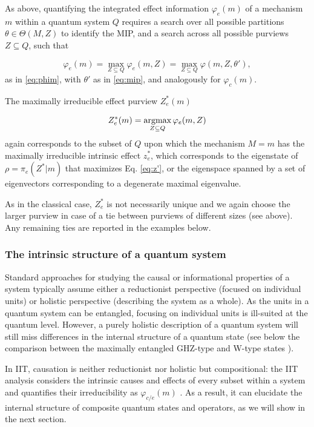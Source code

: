 \documentclass[preprints, article, accept, pdftex, moreauthors, letterpaper]{Definitions/mdpi}
\renewcommand{\=}[1]{\stackrel{#1}{=}} %
\newcommand{\p}{\theta} %
\newcommand{\Part}{\Theta}
\renewcommand{\*}{\otimes}%
\newcommand*{\argmax}{\operatornamewithlimits{argmax}\limits}
\begin{document}
As above, quantifying the integrated effect information $\varphi_e(m)$ of a mechanism $m$ within a quantum system $Q$ requires a search over all possible partitions $\p \in \Part(M,Z)$ to identify the MIP, and a search across all possible purviews $Z \subseteq Q$, such that

\begin{equation}
 \varphi_e(m) = \max_{Z \subseteq Q} \varphi_e(m, Z) = \max_{Z \subseteq Q} \varphi(m, Z, \theta'),   
\end{equation}
as in \eqref{eq:phim}, with $\theta'$ as in \eqref{eq:mip}, and analogously for $\varphi_c(m)$. 

The maximally irreducible effect purview $Z^*_e(m)$ 

\begin{equation}
    Z^*_e(m) = \argmax_{Z \subseteq Q} \varphi_e(m, Z)     
\end{equation}
%
again corresponds to the subset of $Q$ upon which the mechanism $M = m$ has the maximally irreducible intrinsic effect $z^*_e$, which corresponds to the eigenstate of $\rho = \pi_e(Z^*|m)$ that maximizes Eq. \eqref{eq:z'}, or the eigenspace spanned by a set of eigenvectors corresponding to a degenerate maximal eigenvalue.

As in the classical case, $Z^*_e$ is not necessarily unique and we again choose the larger purview in case of a tie between purviews of different sizes (see above). Any remaining ties are reported in the examples below.

\subsubsection{The intrinsic structure of a quantum system}

Standard approaches for studying the causal or informational properties of a system typically assume either a reductionist perspective (focused on individual units) or holistic perspective (describing the system as a whole). 
As the units in a quantum system can be entangled, focusing on individual units is ill-suited at the quantum level. However, a purely holistic description of a quantum system will still miss differences in the internal structure of a quantum state (see below the comparison between the maximally entangled GHZ-type and W-type states \cite{Dur2000}).

In IIT, causation is neither reductionist nor holistic but compositional: the IIT analysis considers the intrinsic causes and effects of every subset within a system and quantifies their irreducibility as $\varphi_{c/e}(m)$ \cite{Albantakis2019cc}. As a result, it can elucidate the internal structure of composite quantum states and operators, as we will show in the next section.
\end{document}
